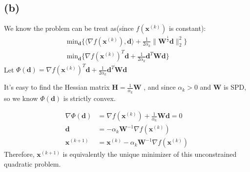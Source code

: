\documentclass{article}
\begin{document}
\subsection*{(b)}
We know the problem can be treat as(since \(f(\bm{x}^{(k)})\) is constant):
\begin{align*}
    \text{min}_{\bm{d}} \{\langle \nabla f(\bm{x}^{(k)}), \bm{d}\rangle + \frac{1}{2\alpha_k} \|\bm{W}^{\frac{1}{2}}\bm{d}\|_2^2\} \\
    \text{min}_{\bm{d}} \{\nabla f(\bm{x}^{(k)})^T\bm{d} + \frac{1}{2\alpha_k} \bm{d}^T\bm{W}\bm{d}\}
\end{align*}
Let \(\Phi(\bm{d}) = \nabla f(\bm{x}^{(k)})^T\bm{d} + \frac{1}{2\alpha_k} \bm{d}^T\bm{W}\bm{d}\)

It's easy to find the Hessian matrix \(\bm{H} = \frac{1}{\alpha_k} \bm{W}\)
, and since \(\alpha_k > 0\) and \(\bm{W}\) is SPD, so we know \(\Phi(\bm{d})\) is strictly convex.

\begin{align*}
    \nabla \Phi(\bm{d}) &= \nabla f(\bm{x}^{(k)}) + \frac{1}{\alpha_k} \bm{W}\bm{d} = 0\\
    \bm{d} &= -\alpha_k \bm{W}^{-1} \nabla f(\bm{x}^{(k)})  \\
    \bm{x}^{(k + 1)} &= \bm{x}^{(k)} - \alpha_k \bm{W}^{-1} \nabla f(\bm{x}^{(k)})
\end{align*}
Therefore, \(\bm{x}^{(k + 1)}\) is equivalently the unique minimizer of this unconstrained quadratic problem.
\end{document}
